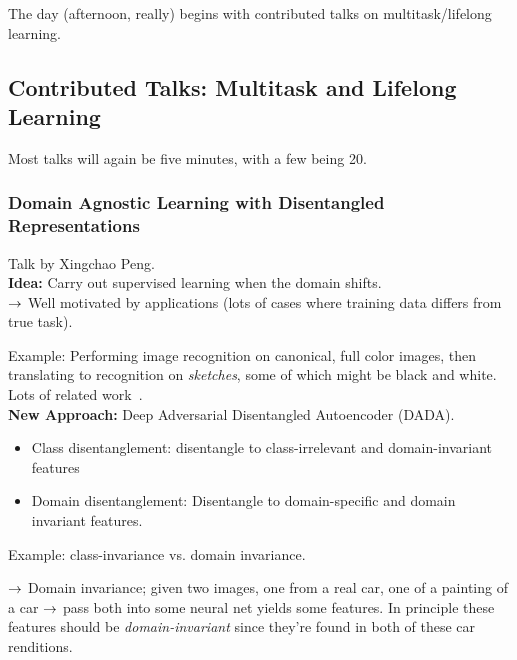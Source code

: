 The day (afternoon, really) begins with contributed talks on multitask/lifelong learning.

\subsection{Contributed Talks: Multitask and Lifelong Learning}

Most talks will again be five minutes, with a few being 20. 

\subsubsection{Domain Agnostic Learning with Disentangled Representations~\cite{peng2019domain}}

Talk by Xingchao Peng. \\

{\bf Idea:} Carry out supervised learning when the domain shifts. \\
$\rightarrow$ Well motivated by applications (lots of cases where training data differs from true task).


Example: Performing image recognition on canonical, full color images, then translating to recognition on {\it sketches}, some of which might be black and white. \\

Lots of related work~\cite{saito2018maximum,ganin2016domain,tzeng2017adversarial}. \\

{\bf New Approach:} Deep Adversarial Disentangled Autoencoder (DADA).
\begin{itemize}
    \item Class disentanglement: disentangle to class-irrelevant and domain-invariant features
    \item Domain disentanglement: Disentangle to domain-specific and domain invariant features.
\end{itemize}

Example: class-invariance vs. domain invariance.

$\rightarrow$ Domain invariance; given two images, one from a real car, one of a painting of a car $\rightarrow$ pass both into some neural net yields some features. In principle these features should be {\it domain-invariant} since they're found in both of these car renditions. \\

